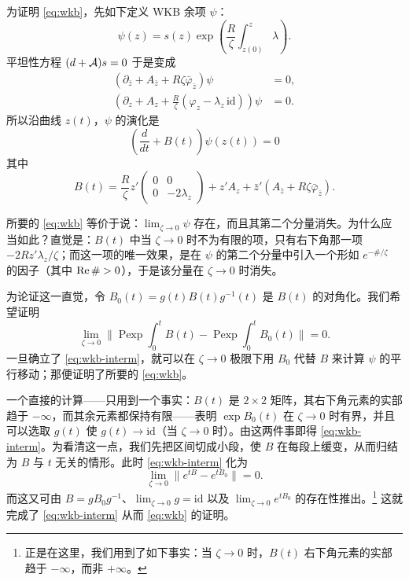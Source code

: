 为证明 \eqref{eq:wkb}，先如下定义 WKB 余项 $\psi$：
\begin{equation} \label{eq:wkb-remainder}
\psi(z) = s(z) \exp\left( \frac{R}{\zeta} \int_{z(0)}^z \lambda \right).
\end{equation}
平坦性方程 $(d+\mathcal{A})s=0$ 于是变成
\begin{align}
(\partial_{\bar z} + A_{\bar z} + R\zeta \bar\varphi_{\bar z}) \psi &= 0, \\
(\partial_z + A_z + \frac{R}{\zeta} (\varphi_z - \lambda_z\, \mathrm{id})) \psi &= 0.
\end{align}
所以沿曲线 $z(t)$，$\psi$ 的演化是
\begin{equation} \label{eq:reduced-ode}
\left( \frac{d}{dt} + B(t) \right) \psi(z(t)) = 0
\end{equation}
其中
\begin{equation}
B(t) = \frac{R}{\zeta} z' \begin{pmatrix} 0 & 0 \\ 0 & -2\lambda_z \end{pmatrix} + z' A_z + \bar z' (A_{\bar z} + R\zeta \bar\varphi_{\bar z}).
\end{equation}

所要的 \eqref{eq:wkb} 等价于说：$\lim_{\zeta\to0}\psi$ 存在，而且其第二个分量消失。为什么应当如此？直觉是：$B(t)$ 中当 $\zeta\to0$ 时不为有限的项，只有右下角那一项 $-2Rz'\lambda_z/\zeta$；而这一项的唯一效果，是在 $\psi$ 的第二个分量中引入一个形如 $e^{-\#/\zeta}$ 的因子（其中 $\operatorname{Re}\# > 0$），于是该分量在 $\zeta\to0$ 时消失。

为论证这一直觉，令 $B_0(t)=g(t)B(t)g^{-1}(t)$ 是 $B(t)$ 的对角化。我们希望证明
\begin{equation} \label{eq:wkb-interm}
\lim_{\zeta\to0} \bigg\lVert \operatorname{Pexp}\int_0^t B(t) - \operatorname{Pexp}\int_0^t B_0(t) \bigg\rVert = 0.
\end{equation}
一旦确立了 \eqref{eq:wkb-interm}，就可以在 $\zeta\to0$ 极限下用 $B_0$ 代替 $B$ 来计算 $\psi$ 的平行移动；那便证明了所要的 \eqref{eq:wkb}。

一个直接的计算——只用到一个事实：$B(t)$ 是 $2\times2$ 矩阵，其右下角元素的实部趋于 $-\infty$，而其余元素都保持有限——表明 $\exp B_0(t)$ 在 $\zeta\to0$ 时有界，并且可以选取 $g(t)$ 使 $g(t)\to\mathrm{id}$（当 $\zeta\to0$ 时）。由这两件事即得 \eqref{eq:wkb-interm}。为看清这一点，我们先把区间切成小段，使 $B$ 在每段上缓变，从而归结为 $B$ 与 $t$ 无关的情形。此时 \eqref{eq:wkb-interm} 化为
\begin{equation}
\lim_{\zeta\to0} \lVert e^{tB} - e^{tB_0} \rVert = 0.
\end{equation}
而这又可由 $B=gB_0g^{-1}$、$\lim_{\zeta\to0}g=\mathrm{id}$ 以及 $\lim_{\zeta\to0}e^{tB_0}$ 的存在性推出。\footnote{正是在这里，我们用到了如下事实：当 $\zeta\to0$ 时，$B(t)$ 右下角元素的实部趋于 $-\infty$，而非 $+\infty$。} 这就完成了 \eqref{eq:wkb-interm} 从而 \eqref{eq:wkb} 的证明。

